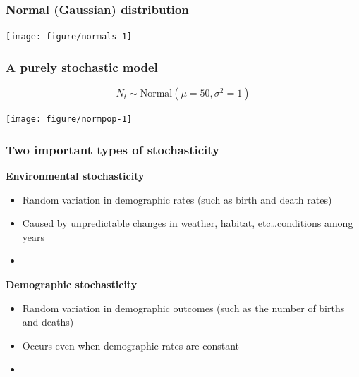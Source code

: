 \documentclass[color=usenames,dvipsnames]{beamer}\usepackage[]{graphicx}\usepackage[]{xcolor}
\newenvironment{knitrout}{}{} %
\begin{document}
\begin{frame}[fragile]
  \frametitle{Normal (Gaussian) distribution}
  \vspace{-0.7cm}
  \begin{center}
\begin{knitrout}
\color{fgcolor}
\texttt{[image: figure/normals-1]} 
\end{knitrout}
  \end{center}
\end{frame}





\begin{frame}[fragile]
  \frametitle{A purely stochastic model}
  \vspace{-3mm}
  \[
    N_t \sim \mbox{Normal}(\mu=50, \sigma^2=1)
  \]
  \vspace{-8mm}

\begin{center}
  \texttt{[image: figure/normpop-1]}
\end{center}
\end{frame}



\begin{frame}
  \frametitle{Two important types of stochasticity}
  {\bf Environmental stochasticity}
  \begin{itemize}
    \item Random variation in demographic rates (such as birth
      and death rates)
    \item Caused by unpredictable changes in weather, habitat,
      etc\dots conditions among years
    \item[]
  \end{itemize}
  \pause
  {\bf Demographic stochasticity}
  \begin{itemize}
    \item Random variation in demographic outcomes (such as the number
      of births and deaths)
    \item Occurs even when demographic rates are constant 
    \item[]
  \end{itemize}
\end{frame}
\end{document}
